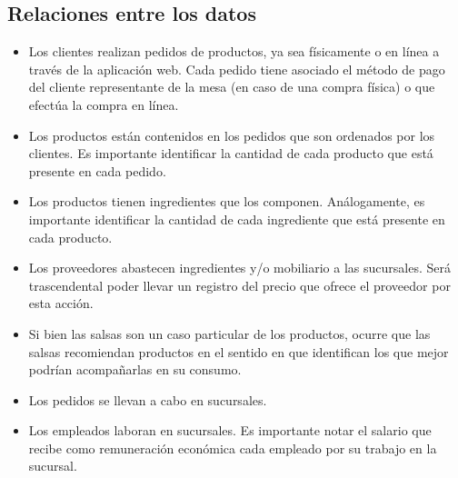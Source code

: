 \documentclass[11pt,letterpaper]{article}
\begin{document}
\subsection{Relaciones entre los datos}

\begin{itemize}
\item Los clientes realizan pedidos de productos, ya sea físicamente o en línea a través de la aplicación web. Cada pedido tiene asociado el método de pago del cliente representante de la mesa (en caso de una compra física) o que efectúa la compra en línea.
\item Los productos están contenidos en los pedidos que son ordenados por los clientes. Es importante identificar la cantidad de cada producto que está presente en cada pedido.
\item Los productos tienen ingredientes que los componen. Análogamente, es importante identificar la cantidad de cada ingrediente que está presente en cada producto.
\item Los proveedores abastecen ingredientes y/o mobiliario a las sucursales. Será trascendental poder llevar un registro del precio que ofrece el proveedor por esta acción.
\item Si bien las salsas son un caso particular de los productos, ocurre que las salsas recomiendan productos en el sentido en que identifican los que mejor podrían acompañarlas en su consumo.
\item Los pedidos se llevan a cabo en sucursales.
\item Los empleados laboran en sucursales. Es importante notar el salario que recibe como remuneración económica cada empleado por su trabajo en la sucursal.  
\end{itemize}
\end{document}
